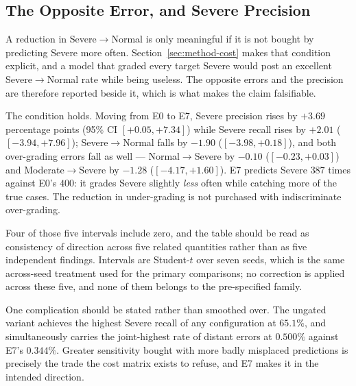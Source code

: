 \documentclass[12pt,a4paper]{report}
\begin{document}
\subsection{The Opposite Error, and Severe Precision}
\label{sec:results-overgrading}

A reduction in Severe$\rightarrow$Normal is only meaningful if it is not bought
by predicting Severe more often. Section~\ref{sec:method-cost} makes that
condition explicit, and a model that graded every target Severe would post an
excellent Severe$\rightarrow$Normal rate while being useless. The opposite
errors and the precision are therefore reported beside it, which is what makes
the claim falsifiable.

\begin{table}[htbp]
  \centering
  \caption{Both directions of the severe error, with Severe precision, averaged
  over seven seeds. Computed from the saved test predictions by
  \texttt{implementation/make\_figures.py}.}
  \label{tab:errdir}
  
\end{table}

The condition holds. Moving from E0 to E7, Severe precision rises by $+3.69$
percentage points (95\% CI $[+0.05, +7.34]$) while Severe recall rises by
$+2.01$ ($[-3.94, +7.96]$); Severe$\rightarrow$Normal falls by $-1.90$
($[-3.98, +0.18]$), and both over-grading errors fall as well ---
Normal$\rightarrow$Severe by $-0.10$ ($[-0.23, +0.03]$) and
Moderate$\rightarrow$Severe by $-1.28$ ($[-4.17, +1.60]$). E7 predicts Severe
$387$ times against E0's $400$: it grades Severe slightly \emph{less} often
while catching more of the true cases. The reduction in under-grading is not
purchased with indiscriminate over-grading.

Four of those five intervals include zero, and the table should be read as
consistency of direction across five related quantities rather than as five
independent findings. Intervals are Student-$t$ over seven seeds, which is the
same across-seed treatment used for the primary comparisons; no correction is
applied across these five, and none of them belongs to the pre-specified family.

One complication should be stated rather than smoothed over. The ungated variant
achieves the highest Severe recall of any configuration at $65.1\%$, and
simultaneously carries the joint-highest rate of distant errors at $0.500\%$
against E7's $0.344\%$. Greater sensitivity bought with more badly misplaced
predictions is precisely the trade the cost matrix exists to refuse, and E7
makes it in the intended direction.
\end{document}
